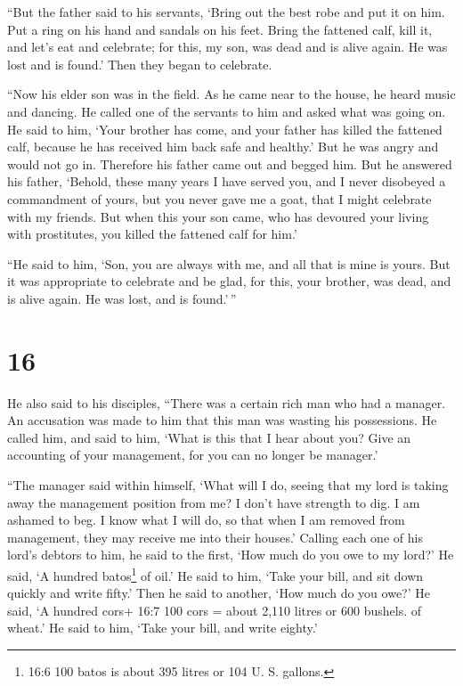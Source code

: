  ``But the father said to his servants, `Bring out the best
robe and put it on him. Put a ring on his hand and sandals on his feet.
 Bring the fattened calf, kill it, and let's eat and
celebrate;  for this, my son, was dead and is alive again.
He was lost and is found.' Then they began to celebrate.

 ``Now his elder son was in the field. As he came near to
the house, he heard music and dancing.  He called one of
the servants to him and asked what was going on.  He said
to him, `Your brother has come, and your father has killed the fattened
calf, because he has received him back safe and healthy.' 
But he was angry and would not go in. Therefore his father came out and
begged him.  But he answered his father, `Behold, these
many years I have served you, and I never disobeyed a commandment of
yours, but you never gave me a goat, that I might celebrate with my
friends.  But when this your son came, who has devoured
your living with prostitutes, you killed the fattened calf for him.'

 ``He said to him, `Son, you are always with me, and all
that is mine is yours.  But it was appropriate to celebrate
and be glad, for this, your brother, was dead, and is alive again. He
was lost, and is found.'\,''

\hypertarget{section-15}{%
\section{16}\label{section-15}}

 He also said to his disciples, ``There was a certain rich
man who had a manager. An accusation was made to him that this man was
wasting his possessions.  He called him, and said to him,
`What is this that I hear about you? Give an accounting of your
management, for you can no longer be manager.'

 ``The manager said within himself, `What will I do, seeing
that my lord is taking away the management position from me? I don't
have strength to dig. I am ashamed to beg.  I know what I
will do, so that when I am removed from management, they may receive me
into their houses.'  Calling each one of his lord's debtors
to him, he said to the first, `How much do you owe to my lord?'
 He said, `A hundred batos\footnote{16:6 100 batos is about
  395 litres or 104 U. S. gallons.} of oil.' He said to him, `Take your
bill, and sit down quickly and write fifty.'  Then he said
to another, `How much do you owe?' He said, `A hundred cors+ 16:7 100
cors = about 2,110 litres or 600 bushels. of wheat.' He said to him,
`Take your bill, and write eighty.'

